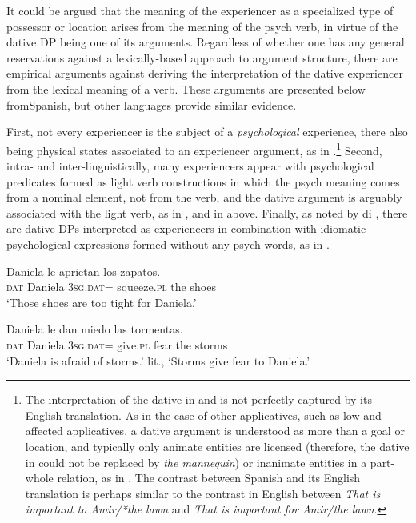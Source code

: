 \documentclass[output=paper,colorlinks,citecolor=brown,nonflat]{./langscibook}
\begin{document}
It could be argued that the meaning of the experiencer as a specialized type of possessor or location arises from the meaning of the psych verb, in virtue of the dative DP being one of its arguments. Regardless of whether one has any general reservations against a lexically-based approach to argument structure, there are empirical arguments against deriving the interpretation of the dative experiencer from the lexical meaning of a verb. These arguments are presented below fromSpanish, but other languages provide similar evidence. 

First, not every experiencer is the subject of a \textit{psychological} experience, there also being physical states associated to an experiencer argument, as in .\footnote{The interpretation of the dative in  and  is not perfectly captured by its English translation. As in the case of other applicatives, such as low and affected applicatives, a dative argument is understood as more than a goal or location, and typically only animate entities are licensed (therefore, the dative in  could not be replaced by \textit{the mannequin}) or inanimate entities in a part-whole relation, as in . The contrast between Spanish  and its English translation is perhaps similar to the contrast in English between \textit{That is important to Amir/*the lawn} and \textit{That is important for Amir/the lawn}.} Second, intra- and inter-linguistically, many experiencers appear with psychological predicates formed as light verb constructions in which the psych meaning comes from a nominal element, not from the verb, and the dative argument is arguably associated with the light verb, as in , and in  above. Finally, as noted by di \citet{DiTullio2015}, there are dative DPs interpreted as experiencers in combination with idiomatic psychological expressions formed without any psych words, as in . 

\ea%
    \label{ex:cuervo:16}
     {Daniela} {le}   {aprietan}  {los} {zapatos}.\\
    \textsc{dat} Daniela  3\textsc{sg.dat}= squeeze.\textsc{pl}   the shoes\\
    \glt ‘Those shoes are too tight for Daniela.’
    \z

\ea%
    \label{ex:cuervo:17}
     {Daniela} {le}   {dan}   {miedo}  {las} {tormentas}.\\
    \textsc{dat} Daniela  3\textsc{sg.dat}= give.\textsc{pl}  fear  the storms\\
    \glt ‘Daniela is afraid of storms.’ lit., ‘Storms give fear to Daniela.’
    \z
\end{document}
